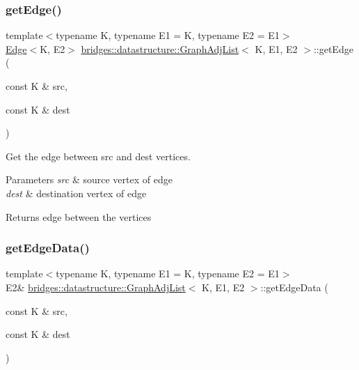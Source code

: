 \subsubsection{\texorpdfstring{get\+Edge()}{getEdge()}}
{\footnotesize\ttfamily template$<$typename K, typename E1 = K, typename E2 = E1$>$ \\
\hyperlink{classbridges_1_1datastructure_1_1_edge}{Edge}$<$K, E2$>$ \hyperlink{classbridges_1_1datastructure_1_1_graph_adj_list}{bridges\+::datastructure\+::\+Graph\+Adj\+List}$<$ K, E1, E2 $>$\+::get\+Edge (\begin{DoxyParamCaption}\item[{const K \&}]{src,  }\item[{const K \&}]{dest }\end{DoxyParamCaption})\hspace{0.3cm}{\ttfamily [inline]}}



Get the edge between src and dest vertices. 


\begin{DoxyParams}{Parameters}
{\em src} & source vertex of edge \\
\hline
{\em dest} & destination vertex of edge \\
\hline
\end{DoxyParams}
\begin{DoxyReturn}{Returns}
edge between the vertices 
\end{DoxyReturn}
\mbox{\label{classbridges_1_1datastructure_1_1_graph_adj_list_ab56ec428deb9a5bc4499f42bbd710b1a}} 
\subsubsection{\texorpdfstring{get\+Edge\+Data()}{getEdgeData()}\hspace{0.1cm}{\footnotesize\ttfamily [1/2]}}
{\footnotesize\ttfamily template$<$typename K, typename E1 = K, typename E2 = E1$>$ \\
E2\& \hyperlink{classbridges_1_1datastructure_1_1_graph_adj_list}{bridges\+::datastructure\+::\+Graph\+Adj\+List}$<$ K, E1, E2 $>$\+::get\+Edge\+Data (\begin{DoxyParamCaption}\item[{const K \&}]{src,  }\item[{const K \&}]{dest }\end{DoxyParamCaption})\hspace{0.3cm}{\ttfamily [inline]}}



